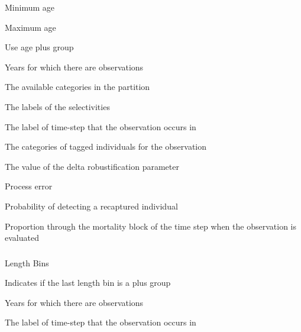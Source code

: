  {Minimum age}

 {Maximum age}

 {Use age plus group}

 {Years for which there are observations}

 {The available categories in the partition}

 {The labels of the selectivities}

 {The label of time-step that the observation occurs in}

 {The categories of tagged individuals for the observation}

 {The value of the delta robustification parameter}

 {Process error}

 {Probability of detecting a recaptured individual}

 {Proportion through the mortality block of the time step when the observation is evaluated}

\subsubsection[Tag Recapture By Length]{}

 {Length Bins}

 {Indicates if the last length bin is a plus group}

 {Years for which there are observations}

 {The label of time-step that the observation occurs in}

